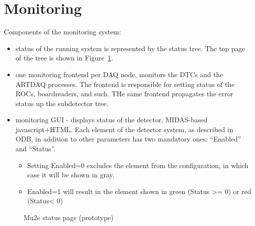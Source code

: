 \section{Monitoring}

Components of the monitoring system:

\begin{itemize}
\item
  status of the running system is represented by the status tree. The top page
  of the tree is shown in Figure~\ref{figure:mu2e_status_page}.
\item
  one monitoring frontend per DAQ node, monitors the DTCs and the ARTDAQ processes.
  The frontend is responsible for setting status of the ROCs, boardreaders, and such.
  THe same frontend propagates the error status up the subdetector tree. 
  \item
  monitoring GUI - displays status of the detector. MIDAS-based javascript+HTML.
  Each element of the detector system, as described in ODB, in addition to other parameters
  has two mandatory ones: ``Enabled'' and ``Status''.
  \begin{itemize}
  \item 
    Setting Enabled=0 excludes the element from the configuration, in which case it will be
    shown in gray.
  \item
    Enabled=1 will result in the element shown in green (Status >= 0) or red (Status< 0) 
  \end{itemize}
\end{itemize}

\begin{figure}[H]
  \caption{
    \label{figure:mu2e_status_page}
    Mu2e status page (prototype)
  }
\end{figure}


